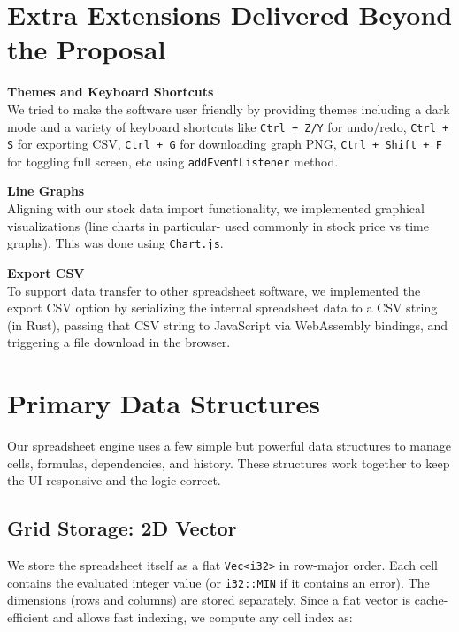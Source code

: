 \documentclass[12pt]{article}
\begin{document}
    \section{Extra Extensions Delivered Beyond the Proposal}
    \begin{description}
        \item\textbf{Themes and Keyboard Shortcuts}\\
        We tried to make the software user friendly by providing themes including a dark mode and a variety of keyboard shortcuts like \texttt{Ctrl + Z/Y} for undo/redo, \texttt{Ctrl + S} for exporting CSV, \texttt{Ctrl + G} for downloading graph PNG, \texttt{Ctrl + Shift + F} for toggling full screen, etc using \texttt{addEventListener} method.
        \item\textbf{Line Graphs} \\
        Aligning with our stock data import functionality, we implemented graphical visualizations (line charts in particular- used commonly in stock price vs time graphs). This was done using \texttt{Chart.js}.
        \item\textbf{Export CSV} \\
        To support data transfer to other spreadsheet software, we implemented the export CSV option by serializing the internal spreadsheet data to a CSV string (in Rust), passing that CSV string to JavaScript via WebAssembly bindings, and triggering a file download in the browser. \\
    \end{description}

    \section{Primary Data Structures}

    Our spreadsheet engine uses a few simple but powerful data structures to manage cells, formulas, dependencies, and history. These structures work together to keep the UI responsive and the logic correct.

    \subsection{Grid Storage: 2D Vector}

    We store the spreadsheet itself as a flat \texttt{Vec<i32>} in row-major order. Each cell contains the evaluated integer value (or \texttt{i32::MIN} if it contains an error). The dimensions (rows and columns) are stored separately. Since a flat vector is cache-efficient and allows fast indexing, we compute any cell index as:
\end{document}
